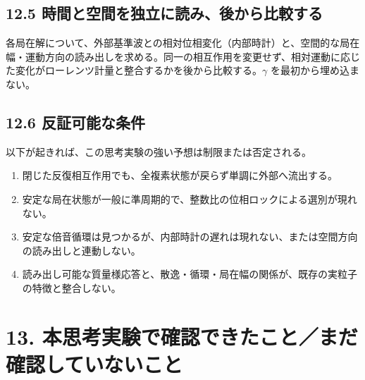 \documentclass[
  a4paper,
]{ltjsarticle}
\providecommand{\tightlist}{%
  \setlength{\itemsep}{0pt}\setlength{\parskip}{0pt}}
\begin{document}
\subsection{12.5
時間と空間を独立に読み、後から比較する}\label{ux6642ux9593ux3068ux7a7aux9593ux3092ux72ecux7acbux306bux8aadux307fux5f8cux304bux3089ux6bd4ux8f03ux3059ux308b}

各局在解について、外部基準波との相対位相変化（内部時計）と、空間的な局在幅・運動方向の読み出しを求める。同一の相互作用を変更せず、相対運動に応じた変化がローレンツ計量と整合するかを後から比較する。\(\gamma\)
を最初から埋め込まない。

\subsection{12.6
反証可能な条件}\label{ux53cdux8a3cux53efux80fdux306aux6761ux4ef6}

以下が起きれば、この思考実験の強い予想は制限または否定される。

\begin{enumerate}
\def\labelenumi{\arabic{enumi}.}
\tightlist
\item
  閉じた反復相互作用でも、全複素状態が戻らず単調に外部へ流出する。
\item
  安定な局在状態が一般に準周期的で、整数比の位相ロックによる選別が現れない。
\item
  安定な倍音循環は見つかるが、内部時計の遅れは現れない、または空間方向の読み出しと連動しない。
\item
  読み出し可能な質量様応答と、散逸・循環・局在幅の関係が、既存の実粒子の特徴と整合しない。
\end{enumerate}

\section{13.
本思考実験で確認できたこと／まだ確認していないこと}\label{ux672cux601dux8003ux5b9fux9a13ux3067ux78baux8a8dux3067ux304dux305fux3053ux3068ux307eux3060ux78baux8a8dux3057ux3066ux3044ux306aux3044ux3053ux3068}
\end{document}
